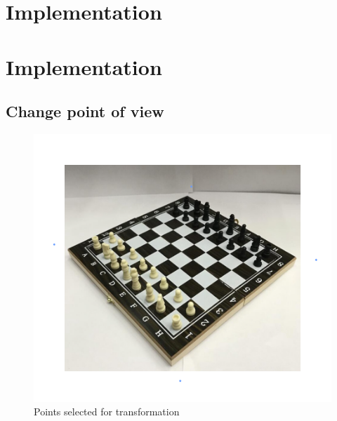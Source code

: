 \documentclass[12pt, letterpaper]{article}
\begin{document}
\section{Implementation}

\section{Implementation}

\subsection{Change point of view}
\begin{figure}[H]
    \centering
    \includegraphics[width=\textwidth]{chesspts.png}
    \caption{Points selected for transformation}
\end{figure}
\end{document}
